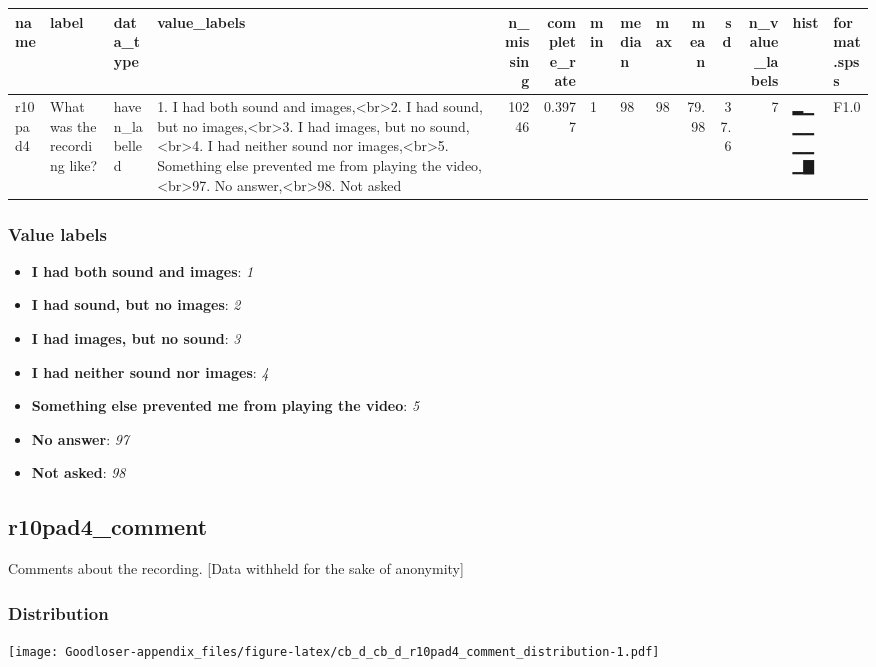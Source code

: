 \documentclass[
]{book}
\providecommand{\tightlist}{%
  \setlength{\itemsep}{0pt}\setlength{\parskip}{0pt}}
\begin{document}
\begin{tabular}{l|l|l|l|r|r|l|l|l|r|r|r|l|l}
\hline
name & label & data_type & value_labels & n_missing & complete_rate & min & median & max & mean & sd & n_value_labels & hist & format.spss\\
\hline
r10pad4 & What was the recording like? & haven_labelled & 1. I had both sound and images,<br>2. I had sound, but no images,<br>3. I had images, but no sound,<br>4. I had neither sound nor images,<br>5. Something else prevented me from playing the video,<br>97. No answer,<br>98. Not asked & 10246 & 0.3977 & 1 & 98 & 98 & 79.98 & 37.6 & 7 & ▂▁▁▁▁▁▁▇ & F1.0\\
\hline
\end{tabular}

\hypertarget{r10pad4_labels}{%
\subsubsection{Value labels}\label{r10pad4_labels}}

\begin{itemize}
\tightlist
\item
  \textbf{I had both sound and images}: \emph{1}
\item
  \textbf{I had sound, but no images}: \emph{2}
\item
  \textbf{I had images, but no sound}: \emph{3}
\item
  \textbf{I had neither sound nor images}: \emph{4}
\item
  \textbf{Something else prevented me from playing the video}: \emph{5}
\item
  \textbf{No answer}: \emph{97}
\item
  \textbf{Not asked}: \emph{98}
\end{itemize}

\hypertarget{r10pad4_comment}{%
\subsection{r10pad4\_comment}\label{r10pad4_comment}}

Comments about the recording. {[}Data withheld for the sake of anonymity{]}

\hypertarget{r10pad4_comment_distribution}{%
\subsubsection{Distribution}\label{r10pad4_comment_distribution}}

\texttt{[image: Goodloser-appendix\_files/figure-latex/cb\_d\_cb\_d\_r10pad4\_comment\_distribution-1.pdf]}
\end{document}
